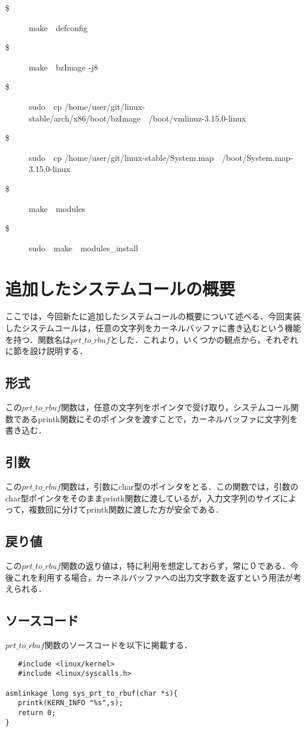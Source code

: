 \documentclass[12pt]{jsarticle}
\begin{document}
\begin{description}
\item [\$] make\ \ defconfig
\item [\$] make\ \ bzImage -j8
\item [\$] sudo\ \ cp \slash{}home\slash{}user\slash{}git\slash{}linux-stable\slash{}arch\slash{}x86\slash{}boot\slash{}bzImage\ \ \slash{}boot\slash{}vmlinuz-3.15.0-linux
\item [\$] sudo\ \ cp \slash{}home\slash{}user\slash{}git\slash{}linux-stable\slash{}System.map\ \ \slash{}boot\slash{}System.map-3.15.0-linux
\item [\$] make\ \ modules
\item [\$] sudo\ \ make\ \ modules\_install
\end{description}

\section{追加したシステムコールの概要}
ここでは，今回新たに追加したシステムコールの概要について述べる．今回実装したシステムコールは，任意の文字列をカーネルバッファに書き込むという機能を持つ．関数名は$prt\_to\_rbuf$とした．これより，いくつかの観点から，それぞれに節を設け説明する．
\subsection{形式}
この$prt\_to\_rbuf$関数は，任意の文字列をポインタで受け取り，システムコール関数であるprintk関数にそのポインタを渡すことで，カーネルバッファに文字列を書き込む．
\subsection{引数}
この$prt\_to\_rbuf$関数は，引数にchar型のポインタをとる．この関数では，引数のchar型ポインタをそのままprintk関数に渡しているが，入力文字列のサイズによって，複数回に分けてprintk関数に渡した方が安全である．
\subsection{戻り値}
この$prt\_to\_rbuf$関数の返り値は，特に利用を想定しておらず，常に０である．今後これを利用する場合，カーネルバッファへの出力文字数を返すという用法が考えられる．
\subsection{ソースコード}
$prt\_to\_rbuf$関数のソースコードを以下に掲載する．
\begin{verbatim}
   #include <linux/kernel>
   #include <linux/syscalls.h>

asmlinkage long sys_prt_to_rbuf(char *s){
   printk(KERN_INFO "%s",s);
   return 0;
}
\end{verbatim}
\end{document}
